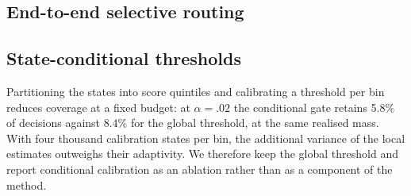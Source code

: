 

\subsection{End-to-end selective routing}


\subsection{State-conditional thresholds}

Partitioning the states into score quintiles and calibrating a threshold per
bin reduces coverage at a fixed budget: at $\alpha=.02$ the conditional gate
retains 5.8\% of decisions against 8.4\% for the global threshold, at the same
realised mass. With four thousand calibration states per bin, the additional
variance of the local estimates outweighs their adaptivity. We therefore keep
the global threshold and report conditional calibration as an ablation rather
than as a component of the method.
